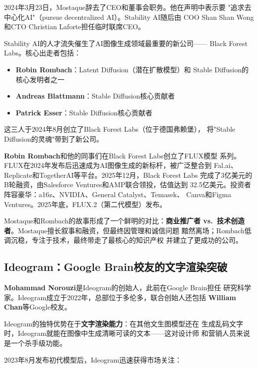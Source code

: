 2024年3月23日，Mostaque辞去了CEO和董事会职务。他在声明中表示要
"追求去中心化AI"（pursue decentralized AI）。Stability AI随后由
COO Shan Shan Wong和CTO Christian Laforte担任临时联席CEO。

\begin{keybox}
Stability AI的人才流失催生了AI图像生成领域最重要的新公司——
Black Forest Labs。核心出走者包括：
\begin{itemize}
  \item \textbf{Robin Rombach}：Latent Diffusion（潜在扩散模型）和
    Stable Diffusion的核心发明者之一
  \item \textbf{Andreas Blattmann}：Stable Diffusion核心贡献者
  \item \textbf{Patrick Esser}：Stable Diffusion核心贡献者
\end{itemize}
这三人于2024年8月创立了Black Forest Labs（位于德国弗赖堡），
将"Stable Diffusion的灵魂"带到了新公司。
\end{keybox}

\textbf{Robin Rombach}和他的同事们在Black Forest Labs创立了FLUX模型
系列。FLUX在2024年发布后迅速成为AI图像生成的新标杆，被广泛整合到
Fal.ai、Replicate和TogetherAI等平台。2025年12月，Black Forest Labs
完成了3亿美元的B轮融资，由Salesforce Ventures和AMP联合领投，估值达到
32.5亿美元。投资者阵容豪华：a16z、NVIDIA、General Catalyst、Temasek、
Canva和Figma Ventures。2025年底，FLUX.2（第二代模型）发布。

Mostaque和Rombach的故事形成了一个鲜明的对比：\textbf{商业推广者
vs.\ 技术创造者}。Mostaque擅长叙事和融资，但最终因管理和诚信问题
黯然离场；Rombach低调沉稳，专注于技术，最终带走了最核心的知识产权
并建立了更成功的公司。

\subsection{Ideogram：Google Brain校友的文字渲染突破}
\label{subsec:founders-ideogram}

\textbf{Mohammad Norouzi}是Ideogram的创始人，此前在Google Brain担任
研究科学家。Ideogram成立于2022年，总部位于多伦多，联合创始人还包括
\textbf{William Chan}等Google校友。

Ideogram的独特优势在于\textbf{文字渲染能力}：在其他文生图模型还在
生成乱码文字时，Ideogram就能在图像中生成清晰可读的文本——这对设计师
和营销人员来说是一个杀手级功能。

2023年8月发布初代模型后，Ideogram迅速获得市场关注：

